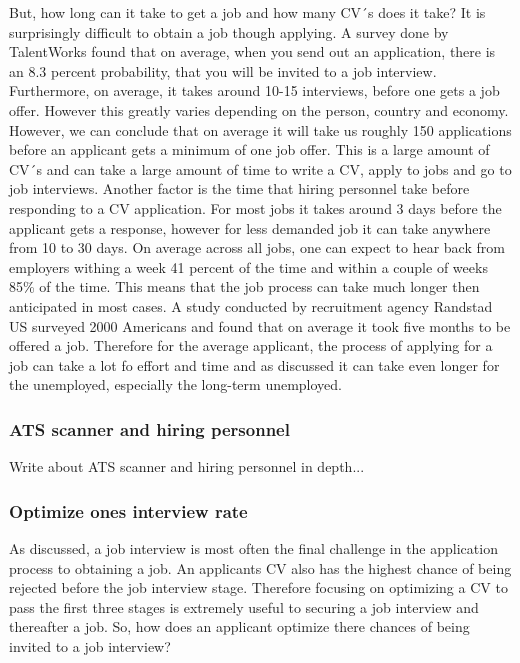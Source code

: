 But, how long can it take to get a job and how many CV´s does it take?
It is surprisingly difficult to obtain a job though applying.
A survey done by TalentWorks found that on average, when you send out an application, there is an 8.3 percent probability, that you will be invited to a job interview. 
Furthermore, on average, it takes around 10-15 interviews, before one gets a job offer. 
However this greatly varies depending on the person, country and economy.
However, we can conclude that on average it will take us roughly 150 applications before an applicant gets a minimum of one job offer.\cite{HR-sales}
This is a large amount of CV´s and can take a large amount of time to write a CV, apply to jobs and go to job interviews.
Another factor is the time that hiring personnel take before responding to a CV application.
For most jobs it takes around 3 days before the applicant gets a response, however for less demanded job it can take anywhere from 10 to 30 days.\cite{HR-sales}
On average across all jobs, one can expect to hear back from employers withing a week 41 percent of the time and within a couple of weeks 85\% of the time.
This means that the job process can take much longer then anticipated in most cases.
A study conducted by recruitment agency Randstad US surveyed 2000 Americans and found that on average it took five months to be offered a job.\cite{5_month_for_a_job}
Therefore for the average applicant, the process of applying for a job can take a lot fo effort and time and as discussed it can take even longer for the unemployed, especially the long-term unemployed. \\

\subsubsection{ATS scanner and hiring personnel}
Write about ATS scanner and hiring personnel in depth...

\subsubsection{Optimize ones interview rate}
As discussed, a job interview is most often the final challenge in the application process to obtaining a job. 
An applicants CV also has the highest chance of being rejected before the job interview stage.
Therefore focusing on optimizing a CV to pass the first three stages is extremely useful to securing a job interview and thereafter a job.
So, how does an applicant optimize there chances of being invited to a job interview? \\

